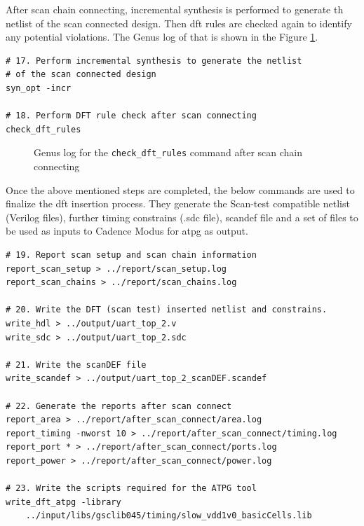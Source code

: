 \documentclass[a4paper,11pt]{article}%
\begin{document}
After scan chain connecting, incremental synthesis is performed to generate th netlist of the scan connected design. Then \ac{dft} rules are checked again to identify any potential violations. The Genus log of that is shown in the Figure \ref{fig:check_dft_rules2}.
 
\begin{Verbatim}[frame=single]
# 17. Perform incremental synthesis to generate the netlist
# of the scan connected design
syn_opt -incr

# 18. Perform DFT rule check after scan connecting
check_dft_rules

\end{Verbatim}

\begin{figure}[H]
	\centering
	\caption{Genus log for the {\tt check\_dft\_rules} command after scan chain connecting}
	\label{fig:check_dft_rules2}
\end{figure}

Once the above mentioned steps are completed, the below commands are used to finalize the \ac{dft} insertion process. They generate the Scan-test compatible netlist (Verilog files), further timing constrains (.sdc file), scan\ac{def} file and a set of files to be used as inputs to Cadence Modus for \ac{atpg} as output.

\begin{Verbatim}[frame=single]
# 19. Report scan setup and scan chain information
report_scan_setup > ../report/scan_setup.log
report_scan_chains > ../report/scan_chains.log

# 20. Write the DFT (scan test) inserted netlist and constrains.
write_hdl > ../output/uart_top_2.v
write_sdc > ../output/uart_top_2.sdc

# 21. Write the scanDEF file
write_scandef > ../output/uart_top_2_scanDEF.scandef

# 22. Generate the reports after scan connect
report_area > ../report/after_scan_connect/area.log
report_timing -nworst 10 > ../report/after_scan_connect/timing.log
report_port * > ../report/after_scan_connect/ports.log
report_power > ../report/after_scan_connect/power.log

# 23. Write the scripts required for the ATPG tool
write_dft_atpg -library
    ../input/libs/gsclib045/timing/slow_vdd1v0_basicCells.lib
\end{Verbatim}
\end{document}
